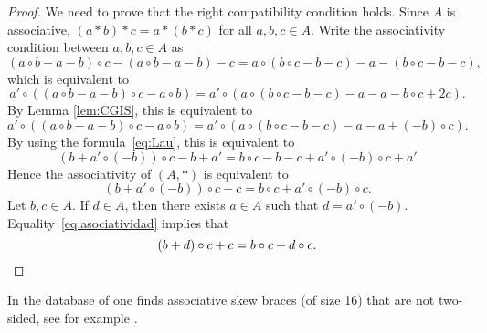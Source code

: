 \begin{proof}
    We need to prove that the right compatibility condition holds. 
    Since $A$ is associative, $(a*b)*c=a*(b*c)$ for all $a,b,c\in A$. Write the associativity condition between $a,b,c\in A$ as
 	\[
 	(a\circ b-a-b)\circ c-(a\circ b-a-b)-c
 	=a\circ (b\circ c-b-c)-a-(b\circ c-b-c),
 	\]
 	which is equivalent to 
 	\[
 	a'\circ ( (a\circ b-a-b)\circ c-a\circ b)
 	=a'\circ ( a\circ (b\circ c-b-c)-a-a-b\circ c+2c).
 	\]
 	By Lemma \ref{lem:CGIS}, this is equivalent to
 	\[ a'\circ ( (a\circ b-a-b)\circ c-a\circ b)
 	=a'\circ ( a\circ (b\circ c-b-c)-a-a+(-b)\circ c).
 	\]
    By using the formula~\eqref{eq:Lau}, this is equivalent to  
 	\[
 	(b+a'\circ(-b))\circ c-b+a'=b\circ c-b-c+a'\circ (-b)\circ c+a'
 	\]
 	Hence the associativity of $(A,*)$ is equivalent to 
 	\begin{equation}
 	    \label{eq:asociatividad}
 		(b+a'\circ (-b))\circ c+c=b\circ c+a'\circ(-b)\circ c.
 	\end{equation}
 	Let $b,c\in A$. If $d\in A$, then there exists $a\in A$ such that $d=a'\circ (-b)$. Equality~\eqref{eq:asociatividad} 
    implies that 
 	\[
 	(b+d)\circ c+c=b\circ c+d\circ c.\qedhere
 	\]
\end{proof}


In the database of \cite{MR3647970} one finds associative skew braces (of size 16) that are not two-sided, see for example \cite{MR4223285}.



	
